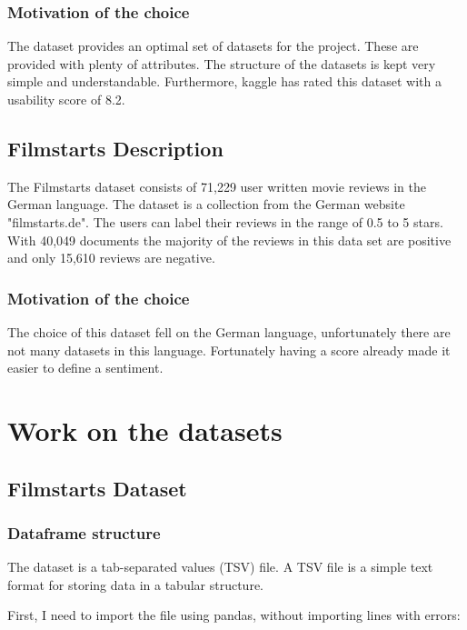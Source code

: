 \subsubsection*{Motivation of the choice}
The dataset provides an optimal set of datasets for the project. These are provided with plenty of attributes. The structure of the datasets is kept very simple and understandable. Furthermore, \gls{kaggle} has rated this \gls{dataset} with a usability score of 8.2.

\subsection{Filmstarts Description}
The Filmstarts dataset \cite{guhr_oliverguhrgerman-sentiment_2021} consists of 71,229 user written movie reviews in the German language. The dataset is a collection from the German website "filmstarts.de". The users can label their reviews in the range of 0.5 to 5 stars. With 40,049 documents the majority of the reviews in this data set are positive and only 15,610 reviews are negative.

\subsubsection*{Motivation of the choice}
The choice of this dataset fell on the German language, unfortunately there are not many datasets in this language. Fortunately having a score already made it easier to define a sentiment.

\section{Work on the datasets}
\label{chap:work on dataset}
\subsection{Filmstarts Dataset}
\subsubsection*{Dataframe structure}
The dataset is a tab-separated values (TSV) file. A TSV file is a simple text format for storing data in a tabular structure.

First, I need to import the file using pandas, without importing lines with errors:

